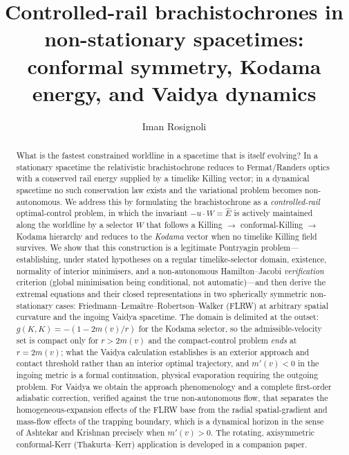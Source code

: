 \documentclass[12pt]{iopart}
\newcommand{\Ehat}{\hat E}
\theoremstyle{plain}
\theoremstyle{definition}
\theoremstyle{plain}
\theoremstyle{remark}
\begin{document}
\title{Controlled-rail brachistochrones in non-stationary spacetimes:
conformal symmetry, Kodama energy, and Vaidya dynamics}

\author{Iman Rosignoli}
\address{Department of Physics, University of Pavia, Via A.\ Bassi 6, 27100 Pavia, Italy}

\begin{abstract}
What is the fastest constrained worldline in a spacetime that is itself evolving? In a
stationary spacetime the relativistic brachistochrone reduces to Fermat/Randers optics
with a conserved rail energy supplied by a timelike Killing vector; in a dynamical
spacetime no such conservation law exists and the variational problem becomes
non-autonomous. We address this by formulating the brachistochrone as a
\emph{controlled-rail} optimal-control problem, in which the invariant $-u\cdot W=\Ehat$ is
actively maintained along the worldline by a selector $W$ that follows a Killing $\to$
conformal-Killing $\to$ Kodama hierarchy and reduces to the \emph{Kodama} vector when no
timelike Killing field survives. We show that this construction is a legitimate
Pontryagin problem---establishing, under stated hypotheses on a regular timelike-selector
domain, existence, normality of interior minimisers, and a non-autonomous Hamilton--Jacobi \emph{verification} criterion (global
minimisation being conditional, not automatic)---and then derive the extremal equations
and their closed representations in two spherically symmetric non-stationary cases:
Friedmann--Lema\^itre--Robertson--Walker (FLRW) at arbitrary spatial curvature and the
ingoing Vaidya spacetime. The domain is delimited at the outset:
$g(K,K)=-(1-2m(v)/r)$ for the Kodama selector, so the admissible-velocity set is
compact only for $r>2m(v)$ and the compact-control problem \emph{ends} at $r=2m(v)$;
what the Vaidya calculation establishes is an exterior approach and contact threshold
rather than an interior optimal trajectory, and $m'(v)<0$ in the ingoing metric is a
formal continuation, physical evaporation requiring the outgoing problem. For Vaidya we
obtain the approach phenomenology and a complete
first-order adiabatic correction, verified against the true non-autonomous flow, that
separates the homogeneous-expansion effects of the FLRW base from the radial
spatial-gradient and mass-flow effects of the trapping boundary, which is a dynamical
horizon in the sense of Ashtekar and Krishnan precisely when $m'(v)>0$. The rotating,
axisymmetric conformal-Kerr (Thakurta--Kerr)
application is developed in a companion paper.
\end{abstract}
\end{document}
